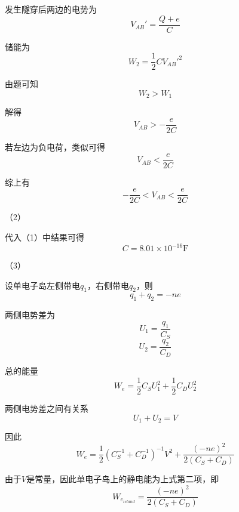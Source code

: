 \documentclass{SCIS2020cn}
\begin{document}
发生隧穿后两边的电势为
\begin{equation}
    V_{AB}'=\frac{Q+e}{C}
\end{equation}

储能为
\begin{equation}
    W_2=\frac{1}{2}CV_{AB}'^2
\end{equation}

由题可知
\begin{equation}
    W_2>W_1
\end{equation}

解得
\begin{equation}
    V_{AB}>-\frac{e}{2C}
\end{equation}

若左边为负电荷，类似可得
\begin{equation}
    V_{AB}<\frac{e}{2C}
\end{equation}

综上有
\begin{equation}
    -\frac{e}{2C}<V_{AB}<\frac{e}{2C}
\end{equation}

（2）

代入（1）中结果可得
\begin{equation}
    C=8.01×10^{-16}\text{F}
\end{equation}

（3）

设单电子岛左侧带电$q_1$，右侧带电$q_2$，则
\begin{equation}
    q_1+q_2=-ne
\end{equation}

两侧电势差为
\begin{equation}
    U_1=\frac{q_1}{C_S}
\end{equation}
\begin{equation}
    U_2=\frac{q_2}{C_D}
\end{equation}

总的能量
\begin{equation}
    W_e=\frac{1}{2}C_SU_1^2+\frac{1}{2}C_DU_2^2
\end{equation}

两侧电势差之间有关系
\begin{equation}
    U_1+U_2=V
\end{equation}

因此
\begin{equation}
    W_e=\frac{1}{2}(C_S^{-1}+C_D^{-1})^{-1}V^2+\frac{(-ne)^2}{2(C_S+C_D)}
\end{equation}

由于$V$是常量，因此单电子岛上的静电能为上式第二项，即
\begin{equation}
    W_{e_{island}}=\frac{(-ne)^2}{2(C_S+C_D)}
\end{equation}
\end{document}
